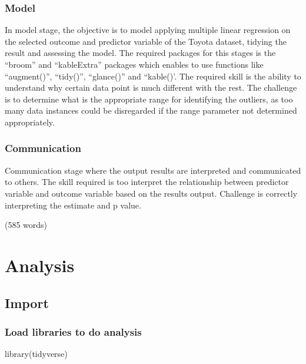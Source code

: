 \documentclass[
]{article}
\newenvironment{Shaded}{\begin{snugshade}}{\end{snugshade}}
\newcommand{\FunctionTok}[1]{\textcolor[rgb]{0.00,0.00,0.00}{#1}}
\newcommand{\NormalTok}[1]{#1}
\begin{document}
\hypertarget{model}{%
\subsubsection{Model}\label{model}}

In model stage, the objective is to model applying multiple linear
regression on the selected outcome and predictor variable of the Toyota
dataset, tidying the result and assessing the model. The required
packages for this stages is the ``broom'' and ``kableExtra'' packages
which enables to use functions like ``augment()'', ``tidy()'',
``glance()'' and ``kable()'. The required skill is the ability to
understand why certain data point is much different with the rest. The
challenge is to determine what is the appropriate range for identifying
the outliers, as too many data instances could be disregarded if the
range parameter not determined appropriately.

\hypertarget{communication}{%
\subsubsection{Communication}\label{communication}}

Communication stage where the output results are interpreted and
communicated to others. The skill required is too interpret the
relationship between predictor variable and outcome variable based on
the results output. Challenge is correctly interpreting the estimate and
p value.

(585 words)

\hypertarget{analysis}{%
\section{Analysis}\label{analysis}}

\hypertarget{import-1}{%
\subsection{Import}\label{import-1}}

\hypertarget{load-libraries-to-do-analysis}{%
\subsubsection{Load libraries to do
analysis}\label{load-libraries-to-do-analysis}}

\begin{Shaded}
\begin{Highlighting}[]
\FunctionTok{library}\NormalTok{(tidyverse) }
\end{Highlighting}
\end{Shaded}
\end{document}
